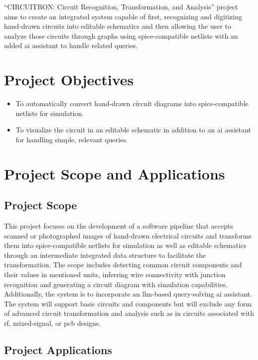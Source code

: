 ``CIRCUITRON: Circuit Recognition, Transformation, and Analysis'' project aims to create an integrated system capable of first, recognizing and digitizing hand-drawn circuits into editable schematics and then allowing the user to analyze those circuits through graphs using \gls{spice}-compatible netlists with an added \gls{ai} assistant to handle related queries.

\section{Project Objectives}

\begin{itemize}
    \item To automatically convert hand-drawn circuit diagrams into \gls{spice}-compatible netlists for simulation.
    \item To visualize the circuit in an editable schematic in addition to an \gls{ai} assistant for handling simple, relevant queries.
\end{itemize}

\section{Project Scope and Applications}

\subsection{Project Scope}

This project focuses on the development of a software pipeline that accepts scanned or photographed images of hand-drawn electrical circuits and transforms them into \gls{spice}-compatible netlists for simulation as well as editable schematics through an intermediate integrated data structure to facilitate the transformation. The scope includes detecting common circuit components and their values in mentioned units, inferring wire connectivity with junction recognition and generating a circuit diagram with simulation capabilities. Additionally, the system is to incorporate an \gls{llm}-based query-solving \gls{ai} assistant. The system will support basic circuits and components but will exclude any form of advanced circuit transformation and analysis such as in circuits associated with \gls{rf}, mixed-signal, or \gls{pcb} designs.

\subsection{Project Applications}


